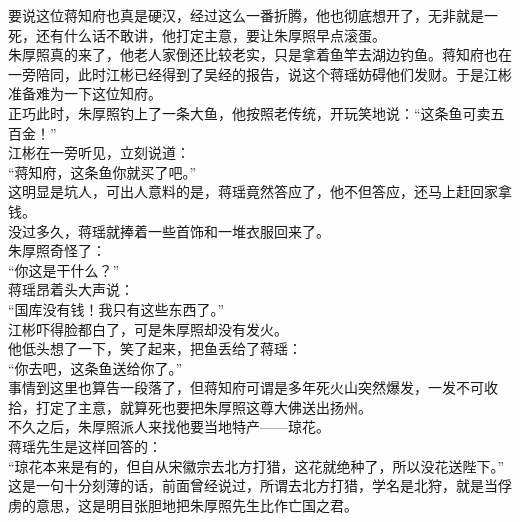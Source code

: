 \begin{multicols}{\theparacolNo}
要说这位蒋知府也真是硬汉，经过这么一番折腾，他也彻底想开了，无非就是一死，还有什么话不敢讲，他打定主意，要让朱厚照早点滚蛋。\\

朱厚照真的来了，他老人家倒还比较老实，只是拿着鱼竿去湖边钓鱼。蒋知府也在一旁陪同，此时江彬已经得到了吴经的报告，说这个蒋瑶妨碍他们发财。于是江彬准备难为一下这位知府。\\

正巧此时，朱厚照钓上了一条大鱼，他按照老传统，开玩笑地说：“这条鱼可卖五百金！”\\

江彬在一旁听见，立刻说道：\\

“蒋知府，这条鱼你就买了吧。”\\

这明显是坑人，可出人意料的是，蒋瑶竟然答应了，他不但答应，还马上赶回家拿钱。\\

没过多久，蒋瑶就捧着一些首饰和一堆衣服回来了。\\

朱厚照奇怪了：\\

“你这是干什么？”\\

蒋瑶昂着头大声说：\\

“国库没有钱！我只有这些东西了。”\\

江彬吓得脸都白了，可是朱厚照却没有发火。\\

他低头想了一下，笑了起来，把鱼丢给了蒋瑶：\\

“你去吧，这条鱼送给你了。”\\

事情到这里也算告一段落了，但蒋知府可谓是多年死火山突然爆发，一发不可收拾，打定了主意，就算死也要把朱厚照这尊大佛送出扬州。\\

不久之后，朱厚照派人来找他要当地特产——琼花。\\

蒋瑶先生是这样回答的：\\

“琼花本来是有的，但自从宋徽宗去北方打猎，这花就绝种了，所以没花送陛下。”\\

这是一句十分刻薄的话，前面曾经说过，所谓去北方打猎，学名是北狩，就是当俘虏的意思，这是明目张胆地把朱厚照先生比作亡国之君。\\


\end{multicols}
